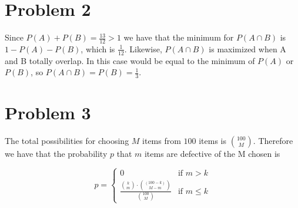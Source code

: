 \section*{Problem 2}
Since $P(A)+P(B)=\frac{13}{12}>1$ we have that the minimum for $P(A\cap B)$ is $1-P(A)-P(B)$, which is $\frac{1}{12}$. Likewise, $P(A\cap B)$ is maximized when A and B totally overlap. In this case
would be equal to the minimum of $P(A)$ or $P(B)$, so $P(A\cap B)=P(B)=\frac{1}{3}$.
\section*{Problem 3}
The total possibilities for choosing $M$ items from $100$ items is $100\choose M$. Therefore we have that
the probability $p$ that $m$ items are defective of the M chosen is 

$$p=\begin{cases}
    0 & \text{if } m>k\\
    \frac{{k\choose m}\cdot {(100-k)\choose M-m}}{{100\choose M}} & \text{if } m\leq k
\end{cases}$$
